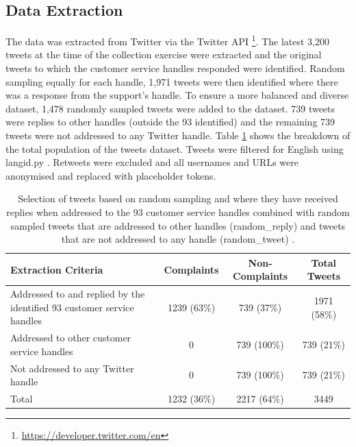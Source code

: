 \subsection{Data Extraction}
The data was extracted from Twitter via the Twitter API \footnote{\url{https://developer.twitter.com/en}}. The latest 3,200 tweets at the time of the collection exercise were extracted and the original tweets to which the customer service handles responded were identified. Random sampling equally for each handle, 1,971 tweets were then identified where there was a response from the support's handle. To ensure a more balanced and diverse dataset, 1,478 randomly sampled tweets were added to the dataset. 739 tweets were replies to other handles (outside the 93 identified) and the remaining 739 tweets were not addressed to any Twitter handle. Table \ref{tab: tweet_counts} shows the breakdown of the total population of the tweets dataset. Tweets were filtered for English using langid.py \cite{luiLangidPyOfftheshelf2012}. Retweets were excluded and all usernames and URLs were anonymised and replaced with placeholder tokens.
\begin{table}[ht]
    \captionsetup{font=small}
    \centering
    \begin{tabularx}{\textwidth}{|X|c|c|c|}
        \hline
        \rowcolor[gray]{0.7}
        \textbf{Extraction Criteria}                                           & \textbf{Complaints} & \textbf{Non-Complaints} & \textbf{Total Tweets} \\
        \hline
        Addressed to and replied by the identified 93 customer service handles & 1239 \small{(63\%)} & 739 \small{(37\%)}      & 1971 \small{(58\%)}   \\
        \hline
        Addressed to other customer service handles                            & 0                   & 739 \small{(100\%)}     & 739 \small{(21\%)}    \\
        \hline
        Not addressed to any Twitter handle                                    & 0                   & 739 \small{(100\%)}     & 739 \small{(21\%)}    \\
        \hline
        \rowcolor[gray]{0.9}
        Total                                                                  & 1232 \small{(36\%)} & 2217 \small{(64\%)}     & 3449                  \\
        \hline
    \end{tabularx}
    \caption{Selection of tweets based on random sampling and where they have received replies when addressed to the 93 customer service handles combined with random sampled tweets that are addressed to other handles (random\_reply) and tweets that are not addressed to any handle (random\_tweet) \cite{preotiuc-pietro_automatically_2019}.}
    \label{tab: tweet_counts}
\end{table}

